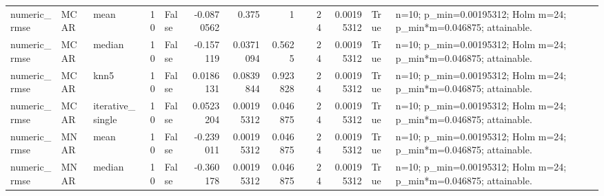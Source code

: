 \begin{table}[ht]
\begin{tabular}{lllrlrrrlrrll}
 numeric\_rmse           & MCAR        & mean             &           10 & False               &      -0.0870562  & 0.375      & 1        &                                                                                                                    &                             24 &                         0.00195312 & True                        & n=10; p\_min=0.00195312; Holm m=24; p\_min*m=0.046875; attainable. \\
 numeric\_rmse           & MCAR        & median           &           10 & False               &      -0.157119   & 0.0371094  & 0.5625   &                                                                                                                    &                             24 &                         0.00195312 & True                        & n=10; p\_min=0.00195312; Holm m=24; p\_min*m=0.046875; attainable. \\
 numeric\_rmse           & MCAR        & knn5             &           10 & False               &       0.0186131  & 0.0839844  & 0.923828 &                                                                                                                    &                             24 &                         0.00195312 & True                        & n=10; p\_min=0.00195312; Holm m=24; p\_min*m=0.046875; attainable. \\
 numeric\_rmse           & MCAR        & iterative\_single &           10 & False               &       0.0523204  & 0.00195312 & 0.046875 &                                                                                                                    &                             24 &                         0.00195312 & True                        & n=10; p\_min=0.00195312; Holm m=24; p\_min*m=0.046875; attainable. \\
 numeric\_rmse           & MNAR        & mean             &           10 & False               &      -0.239011   & 0.00195312 & 0.046875 &                                                                                                                    &                             24 &                         0.00195312 & True                        & n=10; p\_min=0.00195312; Holm m=24; p\_min*m=0.046875; attainable. \\
 numeric\_rmse           & MNAR        & median           &           10 & False               &      -0.360178   & 0.00195312 & 0.046875 &                                                                                                                    &                             24 &                         0.00195312 & True                        & n=10; p\_min=0.00195312; Holm m=24; p\_min*m=0.046875; attainable. \\

\end{tabular}
\end{table}
